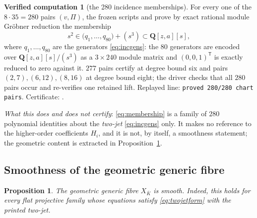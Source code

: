 \documentclass[11pt]{article}
\newtheorem{proposition}[theorem]{Proposition}
\theoremstyle{definition}
\newtheorem{computation}[theorem]{Verified computation}
\theoremstyle{remark}
\newcommand{\QQ}{\mathbf Q}
\begin{document}
\begin{computation}[the 280 incidence memberships]\label{comp:incidence}
For every one of the $8\cdot35=280$ pairs $(v,\Pi)$, the frozen scripts
 and
 prove by exact
rational module Gr\"obner reduction the membership
\[
 s^2\in\bigl(q_1,\ldots,q_{80}\bigr)+(s^3)
 \subset\QQ[z,a][s],
\tag{8.2}\label{eq:membership}
\]
where $q_1,\ldots,q_{80}$ are the generators \eqref{eq:incgens}: the $80$
generators are encoded over $\QQ[z,a][s]/(s^3)$ as a $3\times240$ module
matrix and $(0,0,1)^{\mathsf T}$ is exactly reduced to zero against it.
$277$ pairs certify at degree bound six and pairs $(2,7),(6,12),(8,16)$ at
degree bound eight; the driver checks that all $280$ pairs occur and
re-verifies one retained lift.  Replayed line: \texttt{proved 280/280 chart
pairs}.  Certificate:
.

\emph{What this does and does not certify}: \eqref{eq:membership} is a
family of $280$ polynomial identities about the \emph{two-jet}
\eqref{eq:incgens} only.  It makes no reference to the higher-order
coefficients $H_i$, and it is not, by itself, a smoothness statement; the
geometric content is extracted in Proposition~\ref{prop:smoothgeneric}.
\end{computation}

\subsection{Smoothness of the geometric generic fibre}

\begin{proposition}\label{prop:smoothgeneric}
The geometric generic fibre $X_{\bar K}$ is smooth.  Indeed, this holds for
every flat projective family whose equations satisfy
\eqref{eq:twojetform} with the printed two-jet.
\end{proposition}
\end{document}
